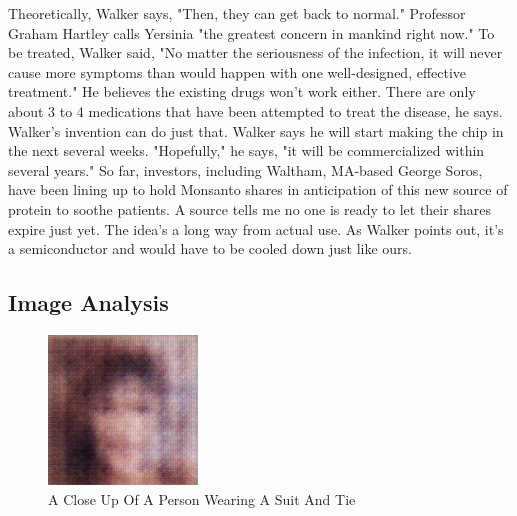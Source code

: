\documentclass{article}%
\begin{document}
Theoretically, Walker says, "Then, they can get back to normal."\newline%
Professor Graham Hartley calls Yersinia "the greatest concern in mankind right now."\newline%
To be treated, Walker said, "No matter the seriousness of the infection, it will never cause more symptoms than would happen with one well{-}designed, effective treatment." He believes the existing drugs won't work either. There are only about 3 to 4 medications that have been attempted to treat the disease, he says. Walker's invention can do just that.\newline%
Walker says he will start making the chip in the next several weeks.\newline%
"Hopefully," he says, "it will be commercialized within several years."\newline%
So far, investors, including Waltham, MA{-}based George Soros, have been lining up to hold Monsanto shares in anticipation of this new source of protein to soothe patients. A source tells me no one is ready to let their shares expire just yet.\newline%
The idea's a long way from actual use. As Walker points out, it's a semiconductor and would have to be cooled down just like ours.

%
\subsection{Image Analysis}%
\label{subsec:ImageAnalysis}%


\begin{figure}[h!]%
\centering%
\includegraphics[width=150px]{500_fake_images/samples_5_90.png}%
\caption{A Close Up Of A Person Wearing A Suit And Tie}%
\end{figure}

%
\end{document}
